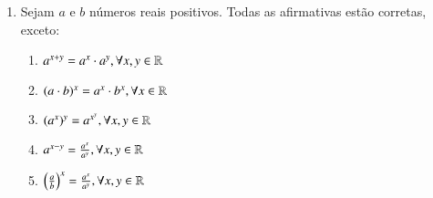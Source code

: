 \begin{enumerate}
  \item Sejam $a$ e $b$ números reais positivos. Todas as afirmativas estão corretas, exceto:
   \begin{enumerate}
   \item $a^{x+y}= a^x \cdot a^y, \forall x, y \in \mathbb{R}$
   \item $(a\cdot b)^{x}= a^x \cdot b^x, \forall x \in \mathbb{R}$
   \item $(a^{x})^y= a^{x^y}, \forall x, y \in \mathbb{R}$
   \item $a^{x-y}= \frac{a^x}{a^y}, \forall x, y \in \mathbb{R}$
   \item $\left(\frac{a}{b}\right)^{x}= \frac{a^x}{a^y}, \forall x, y \in \mathbb{R}$
   \end{enumerate}
 
\end{enumerate}

\newpage
